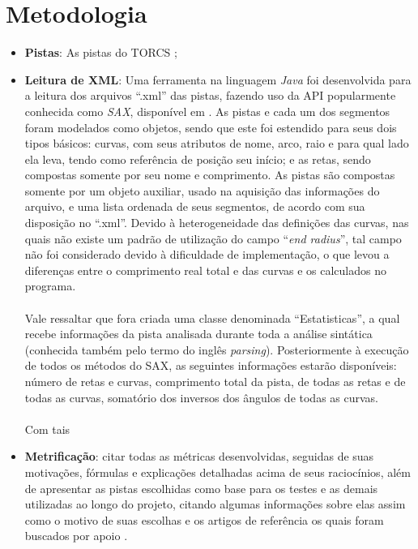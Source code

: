 \documentclass{article}
\begin{document}
\section{Metodologia}
	\begin{itemize}
		\item \textbf{Pistas}: As pistas do TORCS\cite{TORCS} ;

		\item \textbf{Leitura de XML}: Uma ferramenta na linguagem \textit{Java}\cite{Java} foi desenvolvida para a leitura dos arquivos ``.xml'' das pistas, fazendo uso da API popularmente conhecida como \textit{SAX}\cite{SAX}, disponível em \cite{meuGit}. As pistas e cada um dos segmentos foram modelados como objetos, sendo que este foi estendido para seus dois tipos básicos: curvas, com seus atributos de nome, arco, raio e para qual lado ela leva, tendo como referência de posição seu início; e as retas, sendo compostas somente por seu nome e comprimento. As pistas são compostas somente por um objeto auxiliar, usado na aquisição das informações do arquivo, e uma lista ordenada de seus segmentos, de acordo com sua disposição no ``.xml''. Devido à heterogeneidade das definições das curvas, nas quais não existe um padrão de utilização do campo ``\textit{end radius}'', tal campo não foi considerado devido à dificuldade de implementação, o que levou a diferenças entre o comprimento real total e das curvas e os calculados no programa.
		\paragraph{}
		Vale ressaltar que fora criada uma classe denominada ``Estatisticas'', a qual recebe informações da pista analisada durante toda a análise sintática (conhecida também pelo termo do inglês \textit{parsing}). Posteriormente à execução de todos os métodos do SAX, as seguintes informações estarão disponíveis: número de retas e curvas, comprimento total da pista, de todas as retas e de todas as curvas, somatório dos inversos dos ângulos de todas as curvas.
		\paragraph{}
		Com tais 

		\item \textbf{Metrificação}: citar todas as métricas desenvolvidas, seguidas de suas motivações, fórmulas e explicações detalhadas acima de seus raciocínios, além de apresentar as pistas escolhidas como base para os testes e as demais utilizadas ao longo do projeto, citando algumas informações sobre elas assim como o motivo de suas escolhas e os artigos de referência os quais foram buscados por apoio \cite{automaticgen} \cite{trackgen}.
	\end{itemize}
\end{document}
